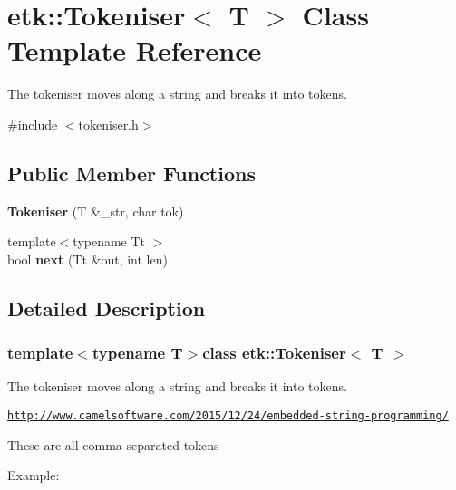 \hypertarget{classetk_1_1_tokeniser}{\section{etk\-:\-:Tokeniser$<$ T $>$ Class Template Reference}
\label{classetk_1_1_tokeniser}
}


The tokeniser moves along a string and breaks it into tokens.  




{\ttfamily \#include $<$tokeniser.\-h$>$}

\subsection*{Public Member Functions}
\begin{DoxyCompactItemize}
\item 
\hypertarget{classetk_1_1_tokeniser_a3f382739ae90860a09ac122a56a0bb52}{{\bfseries Tokeniser} (T \&\-\_\-str, char tok)}\label{classetk_1_1_tokeniser_a3f382739ae90860a09ac122a56a0bb52}

\item 
\hypertarget{classetk_1_1_tokeniser_adc30009214035f3ba25091a0c87416a6}{{\footnotesize template$<$typename Tt $>$ }\\bool {\bfseries next} (Tt \&out, int len)}\label{classetk_1_1_tokeniser_adc30009214035f3ba25091a0c87416a6}

\end{DoxyCompactItemize}


\subsection{Detailed Description}
\subsubsection*{template$<$typename T$>$class etk\-::\-Tokeniser$<$ T $>$}

The tokeniser moves along a string and breaks it into tokens. 

\href{http://www.camelsoftware.com/2015/12/24/embedded-string-programming/}{\tt http\-://www.\-camelsoftware.\-com/2015/12/24/embedded-\/string-\/programming/}

These are all comma separated tokens 
 \begin{DoxyVerb}Example:
\end{DoxyVerb}
 
